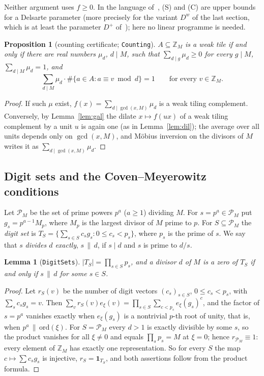 \documentclass[11pt,a4paper]{amsart}
\newtheorem{proposition}[theorem]{Proposition}
\newtheorem{lemma}[theorem]{Lemma}
\theoremstyle{definition}
\theoremstyle{remark}
\newcommand{\Z}{\mathbb{Z}}
\newcommand{\one}{\mathbf{1}}
\newcommand{\lean}[1]{\texttt{#1}}
\begin{document}
Neither argument uses $\hat f\ge 0$. In the language of~\cite{KLMS}, (S) and (C) are upper bounds for a Delsarte
parameter (more precisely for the variant $D^w$ of the last section, which is at least the parameter $D^+$
of~\cite{KLMS}); here no linear programme is needed.

\begin{proposition}[counting certificate; \lean{Counting}]\label{prop:cert}
$A\subseteq\Z_M$ is a weak tile if and only if there are real numbers $\mu_d$, $d\mid M$, such that
$\sum_{d\mid g}\mu_d\ge0$ for every $g\mid M$, $\sum_{d\mid M}\mu_d=1$, and
\[
 \sum_{d\mid M}\mu_d\cdot\#\{a\in A: a\equiv v \bmod d\}=1\qquad\text{for every } v\in\Z_M .
\]
\end{proposition}
\begin{proof}
If such $\mu$ exist, $f(x)=\sum_{d\mid\gcd(x,M)}\mu_d$ is a weak tiling complement. Conversely, by
Lemma~\ref{lem:gal} the dilate $x\mapsto f(ux)$ of a weak tiling complement by a unit $u$ is again one (as in
Lemma~\ref{lem:dil}); the average over all units depends only on $\gcd(x,M)$, and M\"obius inversion on the
divisors of $M$ writes it as $\sum_{d\mid\gcd(x,M)}\mu_d$.
\end{proof}

\subsection*{Digit sets and the Coven--Meyerowitz conditions}
Let $\mathcal P_M$ be the set of prime powers $p^a$ ($a\ge1$) dividing $M$. For $s=p^a\in\mathcal P_M$ put
$g_s=p^{a-1}M_p$, where $M_p$ is the largest divisor of $M$ prime to $p$. For $S\subseteq\mathcal P_M$ the
\emph{digit set} is $T_S=\{\sum_{s\in S}c_sg_s : 0\le c_s<p_s\}$, where $p_s$ is the prime of $s$. We say that
$s$ \emph{divides $d$ exactly}, $s\,\|\,d$, if $s\mid d$ and $s$ is prime to $d/s$.

\begin{lemma}[\lean{DigitSets}]\label{lem:digit}
$|T_S|=\prod_{s\in S}p_s$, and a divisor $d$ of $M$ is a zero of $T_S$ if and only if $s\,\|\,d$ for some $s\in S$.
\end{lemma}
\begin{proof}
Let $r_S(v)$ be the number of digit vectors $(c_s)_{s\in S}$, $0\le c_s<p_s$, with $\sum_sc_sg_s=v$. Then
$\sum_vr_S(v)e_\xi(v)=\prod_{s\in S}\sum_{c<p_s}e_\xi(g_s)^{c}$, and the factor of $s=p^a$ vanishes exactly when
$e_\xi(g_s)$ is a nontrivial $p$-th root of unity, that is, when $p^a\,\|\,\mathrm{ord}(\xi)$. For
$S=\mathcal P_M$ every $d>1$ is exactly divisible by some $s$, so the product vanishes for all $\xi\ne 0$ and
equals $\prod_sp_s=M$ at $\xi=0$; hence $r_{\mathcal P_M}\equiv 1$: every element of $\Z_M$ has exactly one
representation. So for every $S$ the map $c\mapsto\sum c_sg_s$ is injective, $r_S=\one_{T_S}$, and both
assertions follow from the product formula.
\end{proof}
\end{document}
